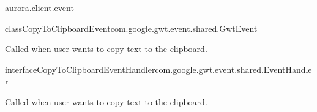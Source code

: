 \begin{texdocpackage}{aurora.client.event}
\begin{texdocclass}{class}{CopyToClipboardEvent}{com.google.gwt.event.shared.GwtEvent}{}
\label{texdoclet:aurora.client.event.CopyToClipboardEvent}
\begin{texdocclassintro}
Called when user wants to copy text to the clipboard.\end{texdocclassintro}
\begin{texdocclassfields}
\end{texdocclassfields}
\begin{texdocclassconstructors}
\end{texdocclassconstructors}
\begin{texdocclassmethods}
\end{texdocclassmethods}
\end{texdocclass}


\begin{texdocclass}{interface}{CopyToClipboardEventHandler}{}{com.google.gwt.event.shared.EventHandler}
\label{texdoclet:aurora.client.event.CopyToClipboardEventHandler}
\begin{texdocclassintro}
Called when user wants to copy text to the clipboard.\end{texdocclassintro}
\begin{texdocclassmethods}
\end{texdocclassmethods}
\end{texdocclass}



\end{texdocpackage}
